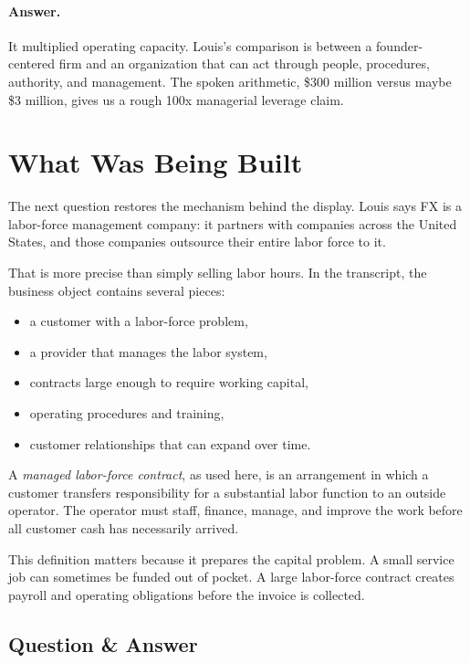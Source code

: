 \paragraph{Answer.} It multiplied operating capacity. Louis's comparison is between a founder-centered firm and an organization that can act through people, procedures, authority, and management. The spoken arithmetic, \$300 million versus maybe \$3 million, gives us a rough 100x managerial leverage claim.

\section{What Was Being Built}

The next question restores the mechanism behind the display. Louis says FX is a labor-force management company: it partners with companies across the United States, and those companies outsource their entire labor force to it.

That is more precise than simply selling labor hours. In the transcript, the business object contains several pieces:
\begin{itemize}
\item a customer with a labor-force problem,
\item a provider that manages the labor system,
\item contracts large enough to require working capital,
\item operating procedures and training,
\item customer relationships that can expand over time.
\end{itemize}

\begin{definition}
A \emph{managed labor-force contract}, as used here, is an arrangement in which a customer transfers responsibility for a substantial labor function to an outside operator. The operator must staff, finance, manage, and improve the work before all customer cash has necessarily arrived.
\end{definition}

This definition matters because it prepares the capital problem. A small service job can sometimes be funded out of pocket. A large labor-force contract creates payroll and operating obligations before the invoice is collected.

\subsection{Question \& Answer}

